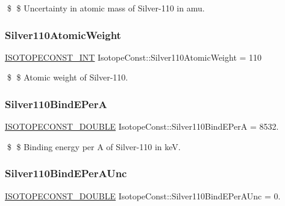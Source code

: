 \$ \$ Uncertainty in atomic mass of Silver-\/110 in amu. \mbox{\label{group___isotope_const-_silver-_ag110_ga2ab2cf5dc28d550638c39ece144fb6e5}} 
\subsubsection{\texorpdfstring{Silver110\+Atomic\+Weight}{Silver110AtomicWeight}}
{\footnotesize\ttfamily \mbox{\hyperlink{group___isotope_const-_macros_ga5f18360b3e99483a35c32d789e62621c}{I\+S\+O\+T\+O\+P\+E\+C\+O\+N\+S\+T\+\_\+\+I\+NT}} Isotope\+Const\+::\+Silver110\+Atomic\+Weight = 110}

\$ \$ Atomic weight of Silver-\/110. \mbox{\label{group___isotope_const-_silver-_ag110_ga7d7b8bed534972d65eddb012c4d6d40c}} 
\subsubsection{\texorpdfstring{Silver110\+Bind\+E\+PerA}{Silver110BindEPerA}}
{\footnotesize\ttfamily \mbox{\hyperlink{group___isotope_const-_macros_ga8f45a7272ce02c0b4c65c44636ed719a}{I\+S\+O\+T\+O\+P\+E\+C\+O\+N\+S\+T\+\_\+\+D\+O\+U\+B\+LE}} Isotope\+Const\+::\+Silver110\+Bind\+E\+PerA = 8532.}

\$ \$ Binding energy per A of Silver-\/110 in keV. \mbox{\label{group___isotope_const-_silver-_ag110_ga780237954538d682dc2d3b1e63bc5094}} 
\subsubsection{\texorpdfstring{Silver110\+Bind\+E\+Per\+A\+Unc}{Silver110BindEPerAUnc}}
{\footnotesize\ttfamily \mbox{\hyperlink{group___isotope_const-_macros_ga8f45a7272ce02c0b4c65c44636ed719a}{I\+S\+O\+T\+O\+P\+E\+C\+O\+N\+S\+T\+\_\+\+D\+O\+U\+B\+LE}} Isotope\+Const\+::\+Silver110\+Bind\+E\+Per\+A\+Unc = 0.}

